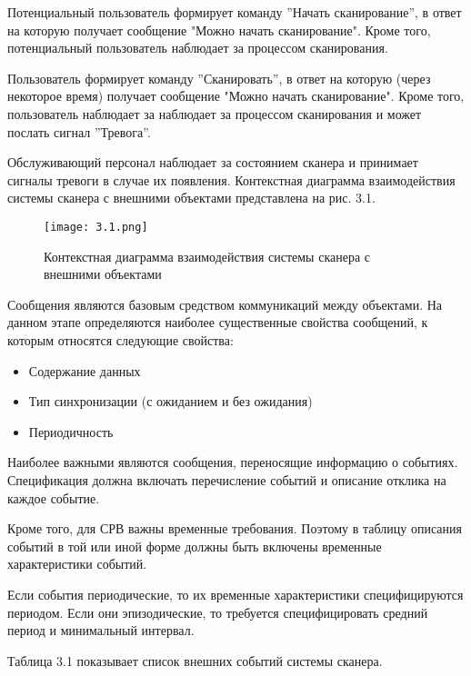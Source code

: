 \documentclass[12pt]{article}
\begin{document}
    Потенциальный пользователь формирует команду ''Начать сканирование'', в ответ на которую получает сообщение "Можно начать сканирование". Кроме того, потенциальный пользователь наблюдает за процессом сканирования.

    Пользователь формирует команду ''Сканировать'', в ответ на которую (через некоторое время) получает сообщение "Можно начать сканирование". Кроме того, пользователь наблюдает за наблюдает за процессом сканирования и может послать сигнал ''Тревога''.

    Обслуживающий персонал наблюдает за состоянием сканера и принимает сигналы тревоги в случае их появления.
    Контекстная диаграмма взаимодействия системы сканера с внешними объектами представлена на рис. 3.1.

    \begin{figure}[h]
        \texttt{[image: 3.1.png]}
        \centering
        \caption{Контекстная диаграмма взаимодействия системы сканера с внешними объектами}
    \end{figure}

    Сообщения являются базовым средством коммуникаций между объектами. На данном этапе определяются наиболее существенные свойства сообщений, к которым относятся следующие свойства:
    \begin{itemize}
        \item Содержание данных
        \item Тип синхронизации (с ожиданием и без ожидания)
        \item Периодичность
    \end{itemize}

    Наиболее важными являются сообщения, переносящие информацию о событиях. Спецификация должна включать перечисление событий и описание отклика на каждое событие.

    Кроме того, для СРВ важны временные требования. Поэтому в таблицу описания событий в той или иной форме должны быть включены временные характеристики событий.

    Если события периодические, то их временные характеристики специфицируются периодом. Если они эпизодические, то требуется специфицировать средний период и минимальный интервал.

    Таблица 3.1 показывает список внешних событий системы сканера.
\end{document}
